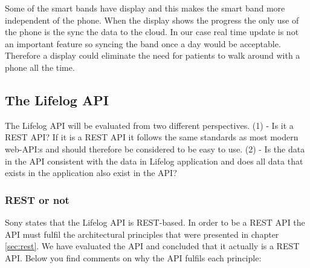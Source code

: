 \documentclass{cslthse-msc}
\begin{document}


Some of the smart bands have display and this makes the smart band more independent of the phone. When the display shows the progress the only use of the phone is the sync the data to the cloud. In our case real time update is not an important feature so syncing the band once a day would be acceptable. Therefore a display could eliminate the need for patients to walk around with a phone all the time.



\subsection{The Lifelog API}

The Lifelog API will be evaluated from two different perspectives. (1) - Is it a REST API? If it is a REST API it follows the same standards as most modern web-API:s and should therefore be considered to be easy to use. (2) - Is the data in the API consistent with the data in Lifelog application and does all data that exists in the application also exist in the API? 

\subsubsection{REST or not}

Sony states that the Lifelog API is REST-based. In order to be a REST API the API must fulfil the architectural principles that were presented in chapter \ref{sec:rest}. We have evaluated the API and concluded that it actually is a REST API. Below you find comments on why the API fulfils each principle: 
\end{document}
